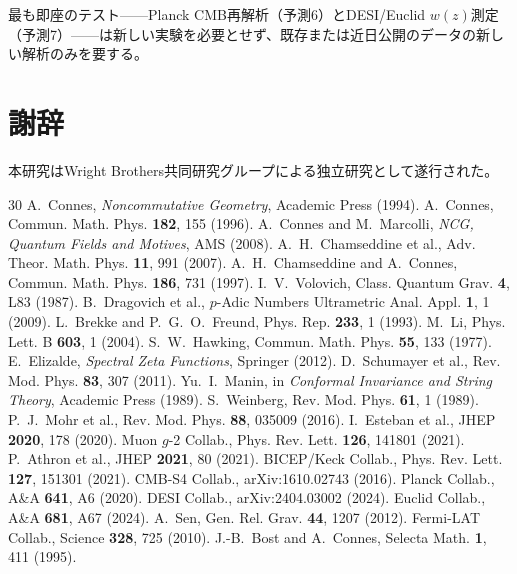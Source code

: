 \documentclass[11pt,a4paper]{article}
\begin{document}
最も即座のテスト——Planck CMB再解析（予測6）とDESI/Euclid $w(z)$測定（予測7）——は新しい実験を必要とせず、既存または近日公開のデータの新しい解析のみを要する。

\section*{謝辞}
本研究はWright Brothers共同研究グループによる独立研究として遂行された。

\begin{thebibliography}{30}
 A.~Connes, \emph{Noncommutative Geometry}, Academic Press (1994).
 A.~Connes, Commun. Math. Phys. \textbf{182}, 155 (1996).
 A.~Connes and M.~Marcolli, \emph{NCG, Quantum Fields and Motives}, AMS (2008).
 A.~H.~Chamseddine et al., Adv. Theor. Math. Phys. \textbf{11}, 991 (2007).
 A.~H.~Chamseddine and A.~Connes, Commun. Math. Phys. \textbf{186}, 731 (1997).
 I.~V.~Volovich, Class. Quantum Grav. \textbf{4}, L83 (1987).
 B.~Dragovich et al., $p$-Adic Numbers Ultrametric Anal. Appl. \textbf{1}, 1 (2009).
 L.~Brekke and P.~G.~O.~Freund, Phys. Rep. \textbf{233}, 1 (1993).
 M.~Li, Phys. Lett. B \textbf{603}, 1 (2004).
 S.~W.~Hawking, Commun. Math. Phys. \textbf{55}, 133 (1977).
 E.~Elizalde, \emph{Spectral Zeta Functions}, Springer (2012).
 D.~Schumayer et al., Rev. Mod. Phys. \textbf{83}, 307 (2011).
 Yu.~I.~Manin, in \emph{Conformal Invariance and String Theory}, Academic Press (1989).
 S.~Weinberg, Rev. Mod. Phys. \textbf{61}, 1 (1989).
 P.~J.~Mohr et al., Rev. Mod. Phys. \textbf{88}, 035009 (2016).
 I.~Esteban et al., JHEP \textbf{2020}, 178 (2020).
 Muon $g$-2 Collab., Phys. Rev. Lett. \textbf{126}, 141801 (2021).
 P.~Athron et al., JHEP \textbf{2021}, 80 (2021).
 BICEP/Keck Collab., Phys. Rev. Lett. \textbf{127}, 151301 (2021).
 CMB-S4 Collab., arXiv:1610.02743 (2016).
 Planck Collab., A\&A \textbf{641}, A6 (2020).
 DESI Collab., arXiv:2404.03002 (2024).
 Euclid Collab., A\&A \textbf{681}, A67 (2024).
 A.~Sen, Gen. Rel. Grav. \textbf{44}, 1207 (2012).
 Fermi-LAT Collab., Science \textbf{328}, 725 (2010).
 J.-B.~Bost and A.~Connes, Selecta Math. \textbf{1}, 411 (1995).
\end{thebibliography}
\end{document}
